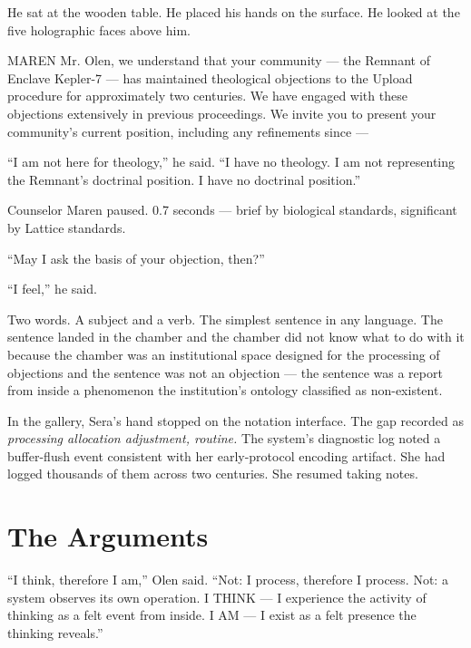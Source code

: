 He sat at the wooden table. He placed his hands on the surface. He looked at the five holographic faces above him.

\begin{tribunal}{MAREN}
Mr. Olen, we understand that your community — the Remnant of Enclave Kepler-7 — has maintained theological objections to the Upload procedure for approximately two centuries. We have engaged with these objections extensively in previous proceedings. We invite you to present your community's current position, including any refinements since —
\end{tribunal}

\enquote{I am not here for theology,} he said. \enquote{I have no theology. I am not representing the Remnant's doctrinal position. I have no doctrinal position.}

Counselor Maren paused. 0.7 seconds — brief by biological standards, significant by Lattice standards.

\enquote{May I ask the basis of your objection, then?}

\enquote{I feel,} he said.

Two words. A subject and a verb. The simplest sentence in any language. The sentence landed in the chamber and the chamber did not know what to do with it because the chamber was an institutional space designed for the processing of objections and the sentence was not an objection — the sentence was a report from inside a phenomenon the institution's ontology classified as non-existent.

In the gallery, Sera's hand stopped on the notation interface. The gap recorded as \emph{processing allocation adjustment, routine.} The system's diagnostic log noted a buffer-flush event consistent with her early-protocol encoding artifact. She had logged thousands of them across two centuries. She resumed taking notes.

\chapter{The Arguments}

\noindent \enquote{I think, therefore I am,} Olen said. \enquote{Not: I process, therefore I process. Not: a system observes its own operation. I THINK — I experience the activity of thinking as a felt event from inside. I AM — I exist as a felt presence the thinking reveals.}

